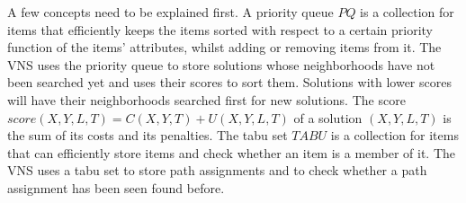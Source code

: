 




%

A few concepts need to be explained first.
A priority queue $PQ$ is a collection for items that efficiently keeps the items sorted with respect to a certain priority function of the items' attributes, whilst adding or removing items from it.
The VNS uses the priority queue to store solutions whose neighborhoods have not been searched yet and uses their scores to sort them.
Solutions with lower scores will have their neighborhoods searched first for new solutions.
The score
$score(X,Y,L,T) = C(X,Y,T) + U(X,Y,L,T)$
of a solution $(X,Y,L,T)$ is the sum of its costs and its penalties.
The tabu set $TABU$ is a collection for items that can efficiently store items and check whether an item is a member of it.
The VNS uses a tabu set to store path assignments and to check whether a path assignment has been seen found before.  \\

